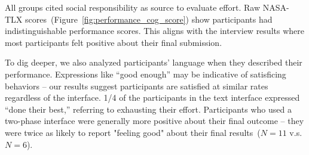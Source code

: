 All groups cited social responsibility as source to evaluate effort. Raw NASA-TLX scores~(Figure~\ref{fig:performance_cog_score}) show participants had indistinguishable performance scores. This aligns with the interview results where most participants felt positive about their final submission. 

To dig deeper, we also analyzed participants' language when they described their performance. Expressions like ``good enough'' may be indicative of satisficing behaviors -- our results suggest participants are satisfied at similar rates regardless of the interface. 1/4 of the participants in the text interface expressed ``done their best,'' referring to exhausting their effort. Participants who used a two-phase interface were generally more positive about their final outcome -- they were twice as likely to report "feeling good" about their final results~($N=11$ v.s. $N=6$).





